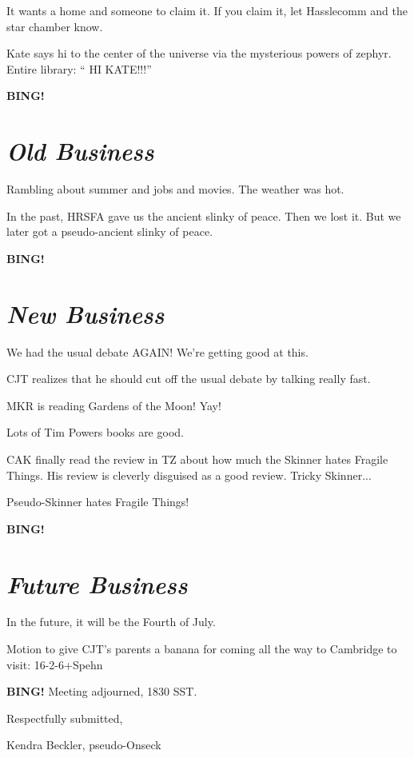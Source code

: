 \documentclass[10pt]{article}
\newcommand{\bing}{{\bf BING!} }
\newcommand{\goto}[1]{\bing \vskip 12pt \section*{{\em{#1}}}}
\begin{document}
It wants a home and someone to claim it.  If you claim it, let Hasslecomm and the star chamber know.

Kate says hi to the center of the universe via the mysterious powers of zephyr.  Entire library: `` HI KATE!!!''

\goto{Old Business}

Rambling about summer and jobs and movies.  The weather was hot.

In the past, HRSFA gave us the ancient slinky of peace.  Then we lost it.  But we later got a pseudo-ancient slinky of peace.

\goto{New Business}

We had the usual debate AGAIN!  We're getting good at this.

CJT realizes that he should cut off the usual debate by talking really fast.

MKR is reading Gardens of the Moon!  Yay!

Lots of Tim Powers books are good.

CAK finally read the review in TZ about how much the Skinner hates Fragile Things.  His review is cleverly disguised as a good review.  Tricky Skinner...

Pseudo-Skinner hates Fragile Things!

\goto{Future Business}

In the future, it will be the Fourth of July.

Motion to give CJT's parents a banana for coming all the way to Cambridge to visit: 16-2-6+Spehn

\bing
\noindent
Meeting adjourned, 1830 SST.

\vspace{18pt}

\centerline{Respectfully submitted,}
\centerline{Kendra Beckler, pseudo-Onseck}
\end{document}
